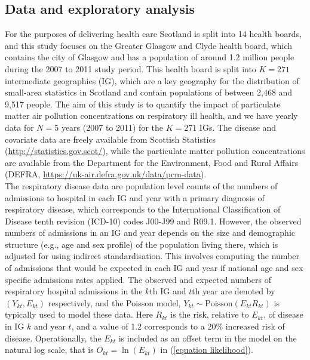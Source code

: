 \documentclass[article, nojss]{jss}
\begin{document}
\subsection{Data and exploratory analysis}
For the purposes of delivering health care Scotland is split into 14 health boards, and this study focuses on the Greater Glasgow and Clyde health board, which contains the city of Glasgow and has a population of around 1.2 million people during the 2007 to 2011 study period. This health board is split into $K=271$ intermediate geographies (IG), which are a key geography for the distribution of small-area statistics in Scotland and contain populations of between 2,468 and 9,517 people. The aim of this study is to quantify the impact of particulate matter air pollution concentrations on respiratory ill health, and we have yearly data for $N=5$ years (2007 to 2011) for the $K=271$ IGs. The disease and covariate data are freely available from Scottish Statistics (\url{http://statistics.gov.scot/}), while the particulate matter pollution concentrations are available from the Department for the Environment, Food and Rural Affairs (DEFRA, \url{https://uk-air.defra.gov.uk/data/pcm-data}).\\

The respiratory disease data are population level counts of the numbers of admissions to hospital in each IG and year with a primary diagnosis of respiratory disease, which corresponds to the International Classification of Disease tenth revision (ICD-10) codes J00-J99 and R09.1. However, the observed numbers of admissions in an IG and year depends on the size and demographic structure (e.g., age and sex profile) of the population living there, which is adjusted for using indirect standardisation. This involves computing the number of admissions that would be expected in each IG and year if national age and sex specific admissions rates applied. The observed and expected numbers of respiratory hospital admissions in the $k$th IG and $t$th year are denoted by $(Y_{kt}, E_{kt})$ respectively, and the Poisson model, $Y_{kt}\sim\mbox{Poisson}(E_{kt}R_{kt})$ is typically used to model these data. Here $R_{kt}$ is the risk, relative to $E_{kt}$, of disease in IG $k$ and year $t$, and a value of 1.2 corresponds to a 20\% increased risk of disease. Operationally, the $E_{kt}$ is included as an offset term in the model on the natural log scale, that is $O_{kt}=\ln(E_{kt})$ in (\ref{equation likelihood}).\\ 
\end{document}
